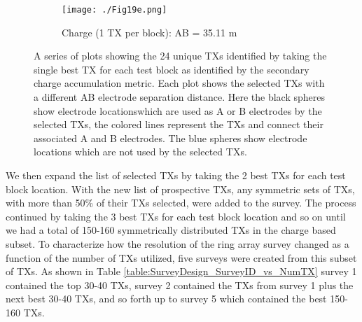 \documentclass[preprint,authoryear,12pt]{elsarticle}
\providecommand{\DIFaddtex}[1]{{\protect\color{blue}\uwave{#1}}} %
\providecommand{\DIFaddFL}[1]{\DIFadd{#1}} %
\providecommand{\DIFaddbeginFL}{} %
\providecommand{\DIFaddendFL}{} %
\providecommand{\DIFdelbeginFL}{} %
\providecommand{\DIFdelendFL}{} %
\providecommand{\DIFadd}[1]{\texorpdfstring{\DIFaddtex{#1}}{#1}} %
\begin{document}
\begin{figure} [htp]
\begin{center}
      \begin{subfigure}{0.6\linewidth}
         \DIFdelbeginFL %
\DIFdelendFL \DIFaddbeginFL \texttt{[image: ./Fig19e.png]}
         \DIFaddendFL \caption{Charge (1 TX per block): AB = 35.11 m}
         \label{fig:SurveyDesign_Charge_1TxPerBlk_AB_35o11m}
      \end{subfigure}

    \end{center}
    \vspace{-0.5cm}
\caption{A series of plots showing the 24 unique TXs identified by taking the single best TX for each test block as identified by the secondary charge accumulation metric. Each plot shows the selected TXs with a different AB electrode separation distance. Here the black spheres show electrode locations\DIFaddbeginFL \DIFaddFL{, }\DIFaddendFL which are used as A or B electrodes by the selected TXs, the colored lines represent the TXs and connect their associated A and B electrodes. The blue spheres show electrode locations which are not used by the selected TXs.}
\label{fig:SurveyDesign_Charge_1TXPerBlk}
\end{figure}


We then expand the list of selected TXs by taking the 2 best TXs for each test block location. With the new list of prospective TXs, any symmetric sets of TXs, with more than 50\% of their TXs selected, were added to the survey. The process continued by taking the 3 best TXs for each test block location and so on until we had a total of 150-160 symmetrically distributed TXs in the charge based subset. To characterize how the resolution of the ring array survey changed as a function of the number of TXs utilized, five surveys were created from this subset of TXs. As shown in Table \ref{table:SurveyDesign_SurveyID_vs_NumTX} survey 1 contained the top 30-40 TXs, survey 2 contained the TXs from survey 1 plus the next best 30-40 TXs, and so forth up to survey 5 which contained the best 150-160 TXs.
\end{document}
